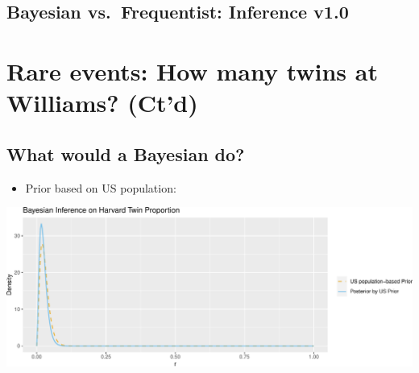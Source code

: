 \documentclass[
]{book}
\providecommand{\tightlist}{%
  \setlength{\itemsep}{0pt}\setlength{\parskip}{0pt}}
\begin{document}
\hypertarget{bayesian-vs.-frequentist-inference-v1.0}{%
\subsection{Bayesian vs.~Frequentist: Inference v1.0}\label{bayesian-vs.-frequentist-inference-v1.0}}

\begin{table}[!h]
\end{table}

\hypertarget{rare-events-how-many-twins-at-williams-ctd}{%
\section*{Rare events: How many twins at Williams? (Ct'd)}\label{rare-events-how-many-twins-at-williams-ctd}}

\hypertarget{what-would-a-bayesian-do}{%
\subsection{What would a Bayesian do?}\label{what-would-a-bayesian-do}}

\begin{itemize}
\tightlist
\item
  Prior based on US population:
\end{itemize}

\includegraphics{_main_files/figure-latex/unnamed-chunk-7-1.pdf}
\end{document}
